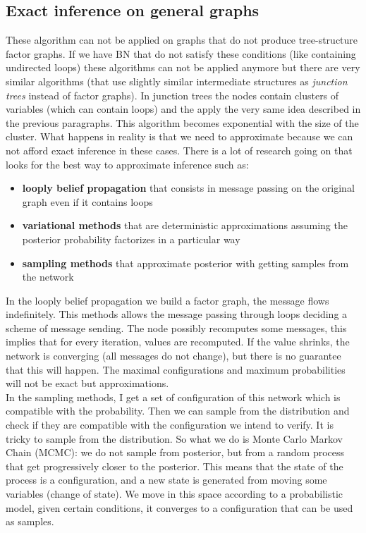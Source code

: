     \subsection{Exact inference on general graphs}
        These algorithm can not be applied on graphs that do not produce tree-structure factor graphs. If we have BN that do not satisfy these conditions (like containing undirected loops) these algorithms can not be applied anymore but there are very similar algorithms (that use slightly similar intermediate structures as \textit{junction trees} instead of factor graphs). 
        In junction trees the nodes contain clusters of variables (which can contain loops) and the apply the very same idea described in the previous paragraphs. This algorithm becomes exponential with the size of the cluster. 
        What happens in reality is that we need to approximate because we can not afford exact inference in these cases. There is a lot of research going on that looks for the best way to approximate inference such as:
        \begin{itemize}
            \item \textbf{looply belief propagation} that consists in message passing on the original graph even if it contains loops
            \item \textbf{variational methods} that are deterministic approximations assuming the posterior probability factorizes in a particular way
            \item \textbf{sampling methods} that approximate posterior with getting samples from the network
        \end{itemize}
        In the looply belief propagation we build a factor graph, the message flows indefinitely. This methods allows the message passing through loops deciding a scheme of message sending. The node possibly recomputes some messages, this implies that for every iteration, values are recomputed. 
        If the value shrinks, the network is converging (all messages do not change), but there is no guarantee that this will happen. The maximal configurations and maximum probabilities will not be exact but approximations. \\
        
        In the sampling methods, I get a set of configuration of this network which is compatible with the probability. Then we can sample from the distribution and check if they are compatible with the configuration we intend to verify. It is tricky to sample from the distribution.
        So what we do is Monte Carlo Markov Chain (MCMC): we do not sample from posterior, but from a random process that get progressively closer to the posterior. This means that the state of the process is a configuration, and a new state is generated from moving some variables (change of state). 
        We move in this space according to a probabilistic model, given certain conditions, it converges to a configuration that can be used as samples.
        